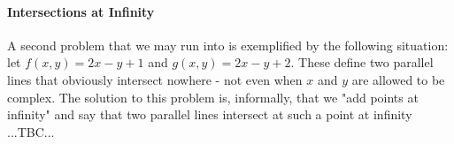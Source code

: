 
\paragraph{Intersections at Infinity}
A second problem that we may run into is exemplified by the following situation: let $f(x,y) = 2 x - y + 1$ and $g(x,y) = 2 x - y + 2$. These define two parallel lines that obviously intersect nowhere - not even when $x$ and $y$ are allowed to be complex. The solution to this problem is, informally, that we "add points at infinity" and say that two parallel lines intersect at such a point at infinity ...TBC...




